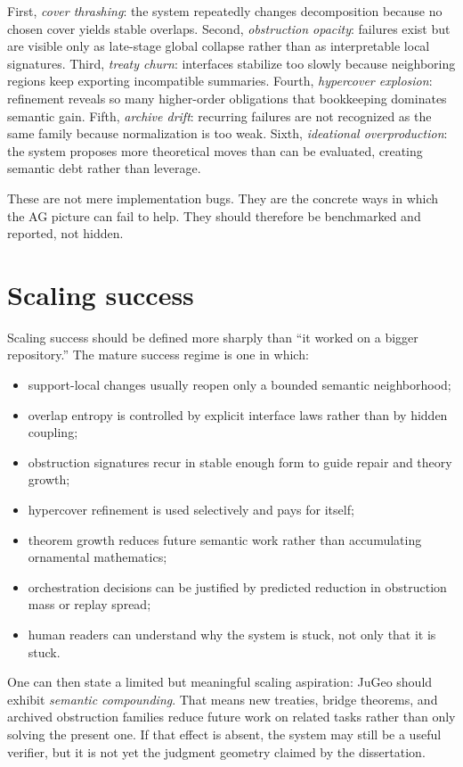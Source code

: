 \documentclass[11pt]{report}
\begin{document}
First, \emph{cover thrashing}: the system repeatedly changes decomposition because no chosen cover yields stable overlaps. Second, \emph{obstruction opacity}: failures exist but are visible only as late-stage global collapse rather than as interpretable local signatures. Third, \emph{treaty churn}: interfaces stabilize too slowly because neighboring regions keep exporting incompatible summaries. Fourth, \emph{hypercover explosion}: refinement reveals so many higher-order obligations that bookkeeping dominates semantic gain. Fifth, \emph{archive drift}: recurring failures are not recognized as the same family because normalization is too weak. Sixth, \emph{ideational overproduction}: the system proposes more theoretical moves than can be evaluated, creating semantic debt rather than leverage.

These are not mere implementation bugs. They are the concrete ways in which the AG picture can fail to help. They should therefore be benchmarked and reported, not hidden.

\section{Scaling success}
Scaling success should be defined more sharply than ``it worked on a bigger repository.'' The mature success regime is one in which:
\begin{itemize}
\item support-local changes usually reopen only a bounded semantic neighborhood;
\item overlap entropy is controlled by explicit interface laws rather than by hidden coupling;
\item obstruction signatures recur in stable enough form to guide repair and theory growth;
\item hypercover refinement is used selectively and pays for itself;
\item theorem growth reduces future semantic work rather than accumulating ornamental mathematics;
\item orchestration decisions can be justified by predicted reduction in obstruction mass or replay spread;
\item human readers can understand why the system is stuck, not only that it is stuck.
\end{itemize}

One can then state a limited but meaningful scaling aspiration: JuGeo should exhibit \emph{semantic compounding}. That means new treaties, bridge theorems, and archived obstruction families reduce future work on related tasks rather than only solving the present one. If that effect is absent, the system may still be a useful verifier, but it is not yet the judgment geometry claimed by the dissertation.
\end{document}
